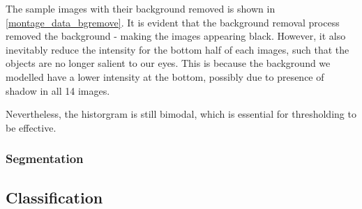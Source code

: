 \documentclass[main.tex]{subfiles}
\begin{document}
%
%


The sample images with their background removed is shown in \autoref{montage_data_bgremove}. It is evident that the background removal process removed the background - making the images appearing black. However, it also inevitably reduce the intensity for the bottom half of each images, such that the objects are no longer salient to our eyes. This is because the background we modelled have a lower intensity at the bottom, possibly due to presence of shadow in all 14 images.

Nevertheless, the historgram  is still bimodal, which is essential for thresholding to be effective.

\subsubsection*{Segmentation}



\subsection{Classification}
\end{document}
